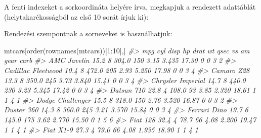 \documentclass[
]{book}
\newenvironment{Shaded}{\begin{snugshade}}{\end{snugshade}}
\newcommand{\CommentTok}[1]{\textcolor[rgb]{0.56,0.35,0.01}{\textit{#1}}}
\newcommand{\DecValTok}[1]{\textcolor[rgb]{0.00,0.00,0.81}{#1}}
\newcommand{\FunctionTok}[1]{\textcolor[rgb]{0.00,0.00,0.00}{#1}}
\newcommand{\NormalTok}[1]{#1}
\newcommand{\SpecialCharTok}[1]{\textcolor[rgb]{0.00,0.00,0.00}{#1}}
\begin{document}
A fenti indexeket a sorkoordináta helyére írva, megkapjuk a rendezett adattáblát (helytakarékosságból az első 10 sorát írjuk ki):

\begin{Shaded}
\end{Shaded}

Rendezési szempontnak a sorneveket is használhatjuk:

\begin{Shaded}
\begin{Highlighting}[]
\NormalTok{mtcars[}\FunctionTok{order}\NormalTok{(}\FunctionTok{rownames}\NormalTok{(mtcars))[}\DecValTok{1}\SpecialCharTok{:}\DecValTok{10}\NormalTok{],]}
\CommentTok{\#\textgreater{}                     mpg cyl  disp  hp drat    wt  qsec vs am gear carb}
\CommentTok{\#\textgreater{} AMC Javelin        15.2   8 304.0 150 3.15 3.435 17.30  0  0    3    2}
\CommentTok{\#\textgreater{} Cadillac Fleetwood 10.4   8 472.0 205 2.93 5.250 17.98  0  0    3    4}
\CommentTok{\#\textgreater{} Camaro Z28         13.3   8 350.0 245 3.73 3.840 15.41  0  0    3    4}
\CommentTok{\#\textgreater{} Chrysler Imperial  14.7   8 440.0 230 3.23 5.345 17.42  0  0    3    4}
\CommentTok{\#\textgreater{} Datsun 710         22.8   4 108.0  93 3.85 2.320 18.61  1  1    4    1}
\CommentTok{\#\textgreater{} Dodge Challenger   15.5   8 318.0 150 2.76 3.520 16.87  0  0    3    2}
\CommentTok{\#\textgreater{} Duster 360         14.3   8 360.0 245 3.21 3.570 15.84  0  0    3    4}
\CommentTok{\#\textgreater{} Ferrari Dino       19.7   6 145.0 175 3.62 2.770 15.50  0  1    5    6}
\CommentTok{\#\textgreater{} Fiat 128           32.4   4  78.7  66 4.08 2.200 19.47  1  1    4    1}
\CommentTok{\#\textgreater{} Fiat X1{-}9          27.3   4  79.0  66 4.08 1.935 18.90  1  1    4    1}
\end{Highlighting}
\end{Shaded}
\end{document}
